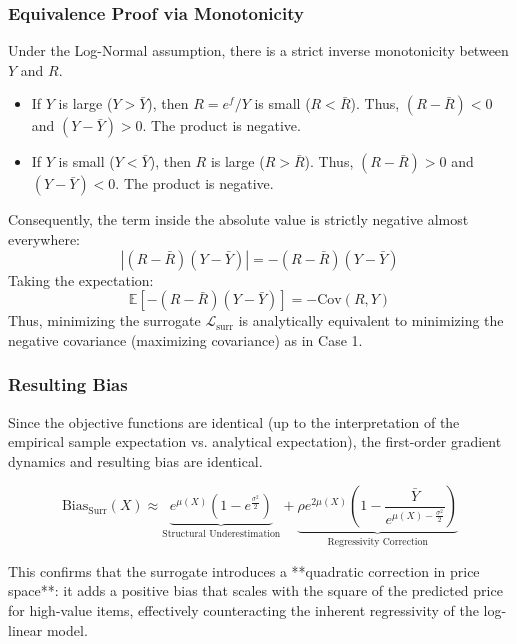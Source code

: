 \documentclass[11pt]{article}
\theoremstyle{plain}
\theoremstyle{definition}
\newcommand{\1}{\mathbf{1}}
\begin{document}
\subsubsection{Equivalence Proof via Monotonicity}
Under the Log-Normal assumption, there is a strict inverse monotonicity between $Y$ and $R$.
\begin{itemize}
    \item If $Y$ is large ($Y > \bar{Y}$), then $R = e^f/Y$ is small ($R < \bar{R}$). Thus, $(R - \bar{R}) < 0$ and $(Y - \bar{Y}) > 0$. The product is negative.
    \item If $Y$ is small ($Y < \bar{Y}$), then $R$ is large ($R > \bar{R}$). Thus, $(R - \bar{R}) > 0$ and $(Y - \bar{Y}) < 0$. The product is negative.
\end{itemize}
Consequently, the term inside the absolute value is strictly negative almost everywhere:
\begin{equation}
    | (R - \bar{R})(Y - \bar{Y}) | = - (R - \bar{R})(Y - \bar{Y})
\end{equation}
Taking the expectation:
\begin{equation}
    \mathbb{E}[ - (R - \bar{R})(Y - \bar{Y}) ] = - \text{Cov}(R, Y)
\end{equation}
Thus, minimizing the surrogate $\mathcal{L}_{\text{surr}}$ is analytically equivalent to minimizing the negative covariance (maximizing covariance) as in Case 1.

\subsubsection{Resulting Bias}
Since the objective functions are identical (up to the interpretation of the empirical sample expectation vs. analytical expectation), the first-order gradient dynamics and resulting bias are identical.

\begin{equation}
    \text{Bias}_{\text{Surr}}(X) \approx \underbrace{e^{\mu(X)}\left(1 - e^{\frac{\sigma^2}{2}}\right)}_{\text{Structural Underestimation}} + \underbrace{\rho e^{2\mu(X)} \left( 1 - \frac{\bar{Y}}{e^{\mu(X) - \frac{\sigma^2}{2}}} \right)}_{\text{Regressivity Correction}}
\end{equation}

This confirms that the surrogate introduces a **quadratic correction in price space**: it adds a positive bias that scales with the square of the predicted price for high-value items, effectively counteracting the inherent regressivity of the log-linear model.
\end{document}
